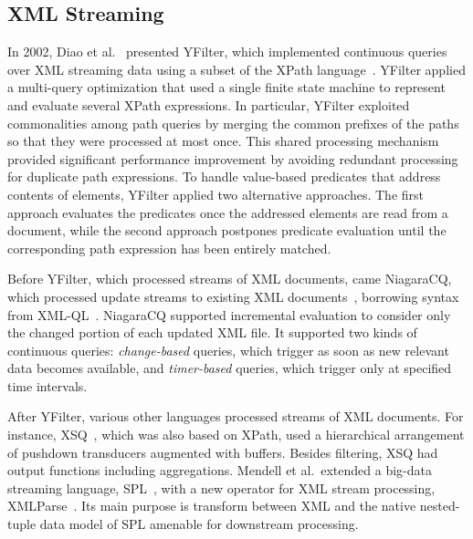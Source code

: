 \subsection{XML Streaming}\label{sec:xml} %

In 2002, Diao et al.~\cite{diao_et_al_2002,diao2003high} presented
\textsf{YFilter}, which implemented continuous queries over XML
streaming data using a subset of the XPath
language~\cite{clark_derose_1999}. YFilter applied a multi-query
optimization that used a single finite state machine to represent and
evaluate several XPath expressions. In particular, YFilter exploited
commonalities among path queries by merging the common prefixes of
the paths so that they were processed at most once. This shared
processing mechanism provided significant performance improvement by
avoiding redundant processing for duplicate path expressions.  To
handle value-based predicates that address contents of elements,
YFilter applied two alternative approa\-ches. The first approach
evaluates the predicates once the addressed elements are read from a
document, while the second approach postpones predicate evaluation
until the corresponding path expression has been entirely matched.

Before YFilter, which processed streams of XML documents, came
\textsf{NiagaraCQ}, which processed update streams to existing XML
documents~\cite{chen_et_al_2000}, borrowing syntax from
XML-QL~\cite{deutsch1999query}.  NiagaraCQ supported incremental
evaluation to consider only the changed portion of each updated XML
file. It supported two kinds of continuous queries:
\emph{change-based} queries, which trigger as soon as new relevant
data becomes available, and \emph{timer-based} queries, which trigger
only at specified time intervals.

After YFilter, various other languages processed streams of XML
documents.  For instance, \textsf{XSQ}~\cite{peng_chawathe_2003}, which was
also based on XPath, used a hierarchical arrangement of pushdown
transducers augmented with buffers. Besides filtering, XSQ had output
functions including aggregations.  Mendell et al.\ extended a big-data
streaming language, SPL~\cite{hirzel_schneider_gedik_2017}, with a new
operator for XML stream processing,
\textsf{XMLParse}~\cite{mendell_et_al_2012}. Its main purpose is
transform between XML and the native nested-tuple data model of SPL
amenable for downstream processing.
